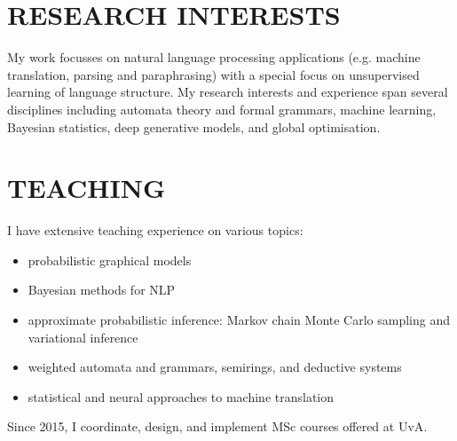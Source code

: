 \section*{RESEARCH INTERESTS}

My work focusses on natural language processing applications (e.g. machine translation, parsing and paraphrasing) with a special focus on unsupervised learning of language structure. 
My research interests and experience span several disciplines including automata theory and formal grammars, machine learning,  Bayesian statistics, deep generative models, and global optimisation.

\section*{TEACHING}

I have extensive teaching experience on various topics:
\begin{itemize}
	\item probabilistic graphical models
	\item Bayesian methods for NLP
	\item approximate probabilistic inference: Markov chain Monte Carlo sampling and variational inference
	\item weighted automata and grammars, semirings, and deductive systems
	\item statistical and neural approaches to machine translation
\end{itemize}

Since 2015, I coordinate, design, and implement MSc courses offered at UvA.

~


